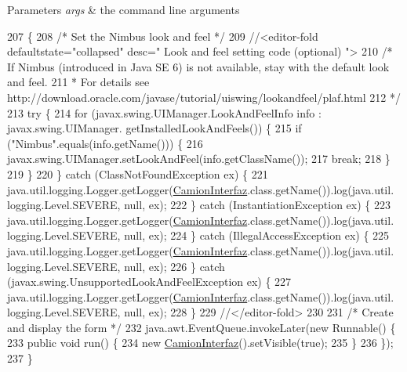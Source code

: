\begin{DoxyParams}{Parameters}
{\em args} & the command line arguments \\
\hline
\end{DoxyParams}

\begin{DoxyCode}
207                                            \{
208         \textcolor{comment}{/* Set the Nimbus look and feel */}
209         \textcolor{comment}{//<editor-fold defaultstate="collapsed" desc=" Look and feel setting code (optional) ">}
210         \textcolor{comment}{/* If Nimbus (introduced in Java SE 6) is not available, stay with the default look and feel.}
211 \textcolor{comment}{         * For details see http://download.oracle.com/javase/tutorial/uiswing/lookandfeel/plaf.html }
212 \textcolor{comment}{         */}
213         \textcolor{keywordflow}{try} \{
214             \textcolor{keywordflow}{for} (javax.swing.UIManager.LookAndFeelInfo info : javax.swing.UIManager.
      getInstalledLookAndFeels()) \{
215                 \textcolor{keywordflow}{if} (\textcolor{stringliteral}{"Nimbus"}.equals(info.getName())) \{
216                     javax.swing.UIManager.setLookAndFeel(info.getClassName());
217                     \textcolor{keywordflow}{break};
218                 \}
219             \}
220         \} \textcolor{keywordflow}{catch} (ClassNotFoundException ex) \{
221             java.util.logging.Logger.getLogger(\mbox{\hyperlink{classejercicio2_1_1_camion_interfaz_a76d59d7f6e7f1f1380532327a3850ed6}{CamionInterfaz}}.class.getName()).log(java.util.
      logging.Level.SEVERE, null, ex);
222         \} \textcolor{keywordflow}{catch} (InstantiationException ex) \{
223             java.util.logging.Logger.getLogger(\mbox{\hyperlink{classejercicio2_1_1_camion_interfaz_a76d59d7f6e7f1f1380532327a3850ed6}{CamionInterfaz}}.class.getName()).log(java.util.
      logging.Level.SEVERE, null, ex);
224         \} \textcolor{keywordflow}{catch} (IllegalAccessException ex) \{
225             java.util.logging.Logger.getLogger(\mbox{\hyperlink{classejercicio2_1_1_camion_interfaz_a76d59d7f6e7f1f1380532327a3850ed6}{CamionInterfaz}}.class.getName()).log(java.util.
      logging.Level.SEVERE, null, ex);
226         \} \textcolor{keywordflow}{catch} (javax.swing.UnsupportedLookAndFeelException ex) \{
227             java.util.logging.Logger.getLogger(\mbox{\hyperlink{classejercicio2_1_1_camion_interfaz_a76d59d7f6e7f1f1380532327a3850ed6}{CamionInterfaz}}.class.getName()).log(java.util.
      logging.Level.SEVERE, null, ex);
228         \}
229         \textcolor{comment}{//</editor-fold>}
230 
231         \textcolor{comment}{/* Create and display the form */}
232         java.awt.EventQueue.invokeLater(\textcolor{keyword}{new} Runnable() \{
233             \textcolor{keyword}{public} \textcolor{keywordtype}{void} run() \{
234                 \textcolor{keyword}{new} \mbox{\hyperlink{classejercicio2_1_1_camion_interfaz_a76d59d7f6e7f1f1380532327a3850ed6}{CamionInterfaz}}().setVisible(\textcolor{keyword}{true});
235             \}
236         \});
237     \}
\end{DoxyCode}


